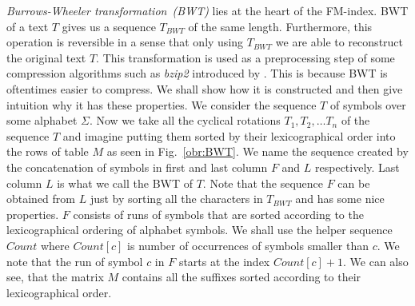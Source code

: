 \textit{Burrows-Wheeler transformation~(BWT)} lies at the heart of the FM-index.
BWT of a text $T$ gives us a sequence $T_{BWT}$ of the same length. Furthermore, this
operation is reversible in a sense that only using $T_{BWT}$ we are able to reconstruct the
original text $T$. This transformation is used as a preprocessing step of some compression
algorithms such as \textit{bzip2} introduced by \cite{seward1996bzip2}. This is because
BWT is oftentimes easier to compress. We shall show how it is constructed and then give 
intuition why it has these properties. We consider the sequence $T$ of symbols over some
alphabet $\Sigma$. Now we take all the cyclical rotations $T_1, T_2, \ldots T_n$ of
the sequence $T$ and imagine putting them sorted by their lexicographical order into the
rows of table $M$ as seen in Fig.~\ref{obr:BWT}. We name the sequence created by the
concatenation of symbols in first and last column $F$ and $L$ respectively. Last column $L$
is what we call the BWT of $T$. Note that the sequence $F$ can be obtained from $L$ just by
sorting all the characters in $T_{BWT}$ and has some nice properties. $F$ consists of runs of
symbols that are sorted according to the lexicographical ordering of alphabet symbols.
We shall use the helper sequence $Count$ where $Count[c]$ is number of occurrences of symbols
smaller than $c$. We note that the run of symbol $c$ in $F$ starts at the index $Count[c]+1$.
We can also see, that the matrix $M$ contains all the suffixes sorted according to their
lexicographical order.

